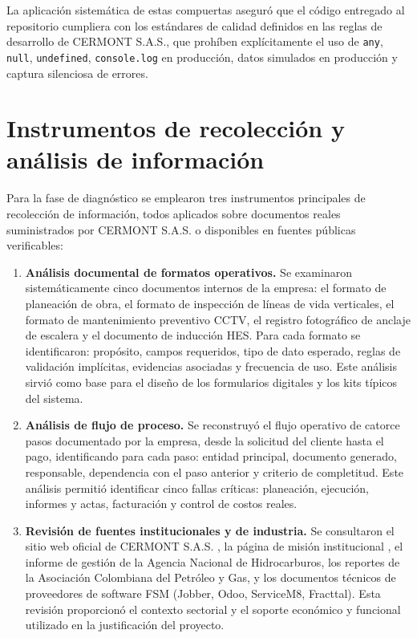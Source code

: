 La aplicación sistemática de estas compuertas aseguró que el código entregado al repositorio cumpliera con los estándares de calidad definidos en las reglas de desarrollo de CERMONT S.A.S., que prohíben explícitamente el uso de \texttt{any}, \texttt{null}, \texttt{undefined}, \texttt{console.log} en producción, datos simulados en producción y captura silenciosa de errores.

\section{Instrumentos de recolección y análisis de información}
\label{sec:instrumentos}

Para la fase de diagnóstico se emplearon tres instrumentos principales de recolección de información, todos aplicados sobre documentos reales suministrados por CERMONT S.A.S. o disponibles en fuentes públicas verificables:

\begin{enumerate}
    \item \textbf{Análisis documental de formatos operativos.} Se examinaron sistemáticamente cinco documentos internos de la empresa: el formato de planeación de obra, el formato de inspección de líneas de vida verticales, el formato de mantenimiento preventivo CCTV, el registro fotográfico de anclaje de escalera y el documento de inducción HES. Para cada formato se identificaron: propósito, campos requeridos, tipo de dato esperado, reglas de validación implícitas, evidencias asociadas y frecuencia de uso. Este análisis sirvió como base para el diseño de los formularios digitales y los kits típicos del sistema.
    \item \textbf{Análisis de flujo de proceso.} Se reconstruyó el flujo operativo de catorce pasos documentado por la empresa, desde la solicitud del cliente hasta el pago, identificando para cada paso: entidad principal, documento generado, responsable, dependencia con el paso anterior y criterio de completitud. Este análisis permitió identificar cinco fallas críticas: planeación, ejecución, informes y actas, facturación y control de costos reales.
    \item \textbf{Revisión de fuentes institucionales y de industria.} Se consultaron el sitio web oficial de CERMONT S.A.S. \cite{cermont_web}, la página de misión institucional \cite{cermont_mision_web}, el informe de gestión de la Agencia Nacional de Hidrocarburos, los reportes de la Asociación Colombiana del Petróleo y Gas, y los documentos técnicos de proveedores de software FSM (Jobber, Odoo, ServiceM8, Fracttal). Esta revisión proporcionó el contexto sectorial y el soporte económico y funcional utilizado en la justificación del proyecto.
\end{enumerate}

